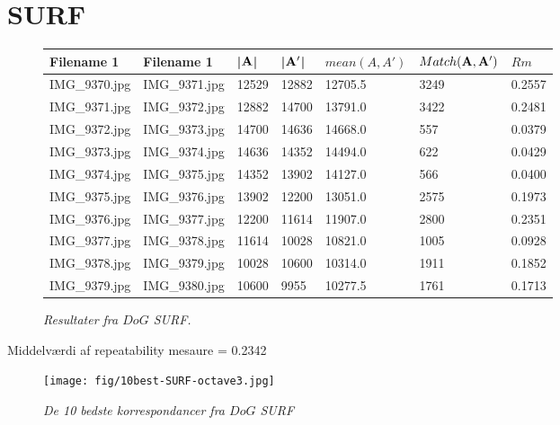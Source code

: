 \section{SURF}
\begin{figure}[H]
    \centering
    \begin{center}    
    \begin{tabular}{ | l | l | l | l | l | l | l |}
    \hline
    Filename 1 & Filename 1 & |$\bold{A}$| & |$\bold{A'}$| & $mean(A,A')$ & $Match(\bold{A}, \bold{A}')$ & $Rm$ \\ \hline
IMG\_9370.jpg &	IMG\_9371.jpg &	12529 &	12882 &	12705.5 &	3249 &	0.2557\\ \hline
IMG\_9371.jpg &	IMG\_9372.jpg &	12882 &	14700 &	13791.0 &	3422 &	0.2481\\ \hline
IMG\_9372.jpg &	IMG\_9373.jpg &	14700 &	14636 &	14668.0 &	557 &	0.0379\\ \hline
IMG\_9373.jpg &	IMG\_9374.jpg &	14636 &	14352 &	14494.0 &	622 &	0.0429\\ \hline
IMG\_9374.jpg &	IMG\_9375.jpg &	14352 &	13902 &	14127.0 &	566 &	0.0400\\ \hline
IMG\_9375.jpg &	IMG\_9376.jpg &	13902 &	12200 &	13051.0 &	2575 &	0.1973\\ \hline
IMG\_9376.jpg &	IMG\_9377.jpg &	12200 &	11614 &	11907.0 &	2800 &	0.2351\\ \hline
IMG\_9377.jpg &	IMG\_9378.jpg &	11614 &	10028 &	10821.0 &	1005 &	0.0928\\ \hline
IMG\_9378.jpg &	IMG\_9379.jpg &	10028 &	10600 &	10314.0 &	1911 &	0.1852\\ \hline
IMG\_9379.jpg &	IMG\_9380.jpg &	10600 &	9955 &	10277.5 &	1761 &	0.1713\\ \hline
    \end{tabular}       
    \caption{{\footnotesize \textit{Resultater fra $DoG$ SURF.}}}
    \label{tab:SURFOCTAVE3}
     \end{center}
     \vspace{-2.5em}
\end{figure} \noindent
Middelværdi af repeatability mesaure = 0.2342
\begin{figure}[H]
    \centering
    \texttt{[image: fig/10best-SURF-octave3.jpg]}
    \vspace{-0.5em}   
    \begin{center}
    \caption{{\footnotesize \textit{
    De 10 bedste korrespondancer fra $DoG$ SURF}}}
    \label{fig:lindblob}
     \end{center}
  \end{figure}
       \vspace{-2.7em}
\noindent
